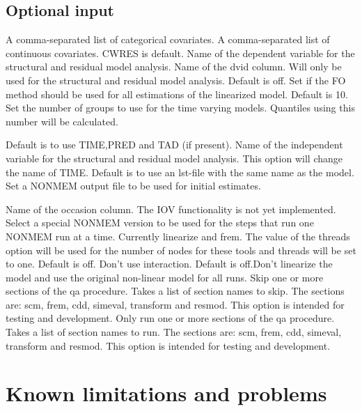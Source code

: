 \subsection{Optional input}

\begin{optionlist}
A comma-separated list of categorical covariates.
\nextopt
{}
A comma-separated list of continuous covariates.
\nextopt
{}
CWRES is default. Name of the dependent variable for the structural and residual model analysis. 
\nextopt
{}
Name of the dvid column.
Will only be used for the structural and residual model analysis.
\nextopt
{}
Default is off. Set if the FO method should be used for all estimations
of the linearized model. 
\nextopt
{}
Default is 10. Set the number of groups to use for the time varying models.
Quantiles using this number will be calculated.

\nextopt
{}
Default is to use TIME,PRED and TAD (if present). Name of the independent variable for the structural and residual model analysis.
This option will change the name of TIME.
\nextopt
{}
Default is to use an lst-file with the same name as the model. Set a NONMEM output file to be used for initial estimates.

\nextopt
{}
Name of the occasion column. The IOV functionality is not yet implemented.
\nextopt
{}
	Select a special NONMEM version to be used for the steps
    that run one NONMEM run at a time. Currently linearize
    and frem. The value of the threads option will be used for
    the number of nodes for these tools and threads will be set
    to one.
\nextopt
{}
Default is off. Don't use interaction. 
\nextopt
{}
Default is off.Don't linearize the model and use the original non-linear model for all runs. 
\nextopt
{}
Skip one or more sections of the qa procedure. Takes a list of section names to skip. The sections are: scm, frem, cdd, simeval,
transform and resmod. This option is intended for testing and development.
\nextopt
{}
Only run one or more sections of the qa procedure. Takes a list of section names to run. The sections are: scm, frem, cdd, simeval, transform and resmod. This option is intended for testing and development.
    \nextopt
\end{optionlist}

\section{Known limitations and problems}

